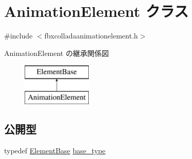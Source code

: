\hypertarget{class_animation_element}{}\section{Animation\+Element クラス}
\label{class_animation_element}


{\ttfamily \#include $<$fbxcolladaanimationelement.\+h$>$}

Animation\+Element の継承関係図\begin{figure}[H]
\begin{center}
\leavevmode
\includegraphics[height=2.000000cm]{class_animation_element}
\end{center}
\end{figure}
\subsection*{公開型}
\begin{DoxyCompactItemize}
\item 
typedef \hyperlink{class_element_base}{Element\+Base} \hyperlink{class_animation_element_aaf3cccce84fd90fe8e08b1a45a5fc8a2}{base\+\_\+type}
\end{DoxyCompactItemize}
